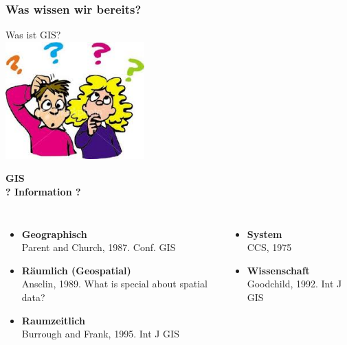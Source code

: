 \documentclass{beamer}
\begin{document}
\begin{frame}
\frametitle{Was wissen wir bereits?}
\centering
\Huge \alert{Was ist GIS?}\\
\vspace{1cm}
\includegraphics[width=0.4\textwidth]{Figures/Questions.png}
\end{frame}


\begin{frame}
\centering
\Huge \alert{\textbf{GIS}}\\
\pause
\Large \textbf{? Information ?}
\pause
\medskip
\normalsize
\begin{columns}[t]
\begin{itemize}
\item \alert{\textbf{Geographisch}}\\
Parent and Church, 1987. Conf. GIS
\item \alert {\textbf {Räumlich (Geospatial)}}\\
Anselin, 1989. What is special about spatial data?
\item \alert{\textbf{Raumzeitlich}}\\
Burrough and Frank, 1995. Int J GIS
\end{itemize}
\hspace{2cm}
\pause
{}
\begin{itemize}
\item \alert{\textbf{System}}\\
CCS, 1975
\item \alert{\textbf{Wissenschaft}}\\
Goodchild, 1992. Int J GIS
\end{itemize}
\end{columns}
\end{frame}

\end{document}

